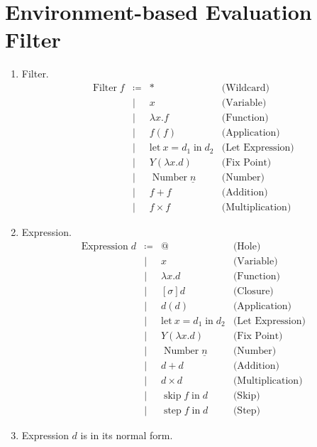 \documentclass{article}
\newcommand{\final}{~\mathbf{final}}
\newcommand{\class}[1]{\operatorname{#1}}
\DeclareMathOperator{\fskip}{skip}
\DeclareMathOperator{\fstep}{step}
\newcommand{\fin}{\mathrel{\mathop{\text{in}}}}
\newcommand{\flet}{\mathrm{let}~}
\begin{document}
\section{Environment-based Evaluation Filter}

\begin{enumerate}
  \item {} Filter.
    \[
      \begin{array}{rcll}
        \class{Filter} f
        &\coloneqq& \ast & \text{(Wildcard)}\\
        &\mid& x & \text{(Variable)}\\
        &\mid& \lambda x . f & \text{(Function)}\\
        &\mid& f(f) & \text{(Application)}\\
        &\mid& \flet x = d_1 \fin d_2 & \text{(Let Expression)}\\
        &\mid& Y (\lambda x . d) & \text{(Fix Point)}\\
        &\mid& \class{Number} \underline{n} & \text{(Number)}\\
        &\mid& f + f & \text{(Addition)} \\
        &\mid& f \times f & \text{(Multiplication)}
      \end{array}
    \]
  \item {} Expression.
    \[
      \begin{array}{rcll}
        \class{Expression} d
        &\coloneqq& @ & \text{(Hole)} \\
        &\mid& x & \text{(Variable)} \\
        &\mid& \lambda x . d & \text{(Function)} \\
        &\mid& [\sigma] d & \text{(Closure)} \\
        &\mid& d (d) & \text{(Application)} \\
        &\mid& \flet x = d_1 \fin d_2 & \text{(Let Expression)}\\
        &\mid& Y (\lambda x . d) & \text{(Fix Point)}\\
        &\mid& \class{Number} \underline{n} & \text{(Number)} \\
        &\mid& d + d & \text{(Addition)} \\
        &\mid& d \times d & \text{(Multiplication)} \\
        &\mid& \fskip f \fin d & \text{(Skip)}\\
        &\mid& \fstep f \fin d & \text{(Step)}
      \end{array}
    \]
  \item \fbox{\(d \final\)} Expression \(d\) is in its normal form. 


\end{enumerate}
\end{document}
